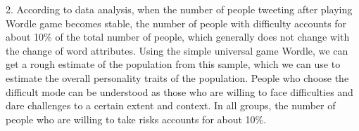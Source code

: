 \documentclass[12pt]{article}  %
\begin{document}
2. According to data analysis, when the number of people tweeting after playing Wordle game becomes stable, the number of people with difficulty accounts for about 10\% of the total number of people, which generally does not change with the change of word attributes. Using the simple universal game Wordle, we can get a rough estimate of the population from this sample, which we can use to estimate the overall personality traits of the population. People who choose the difficult mode can be understood as those who are willing to face difficulties and dare challenges to a certain extent and context. In all groups, the number of people who are willing to take risks accounts for about 10\%.


\end{document}
